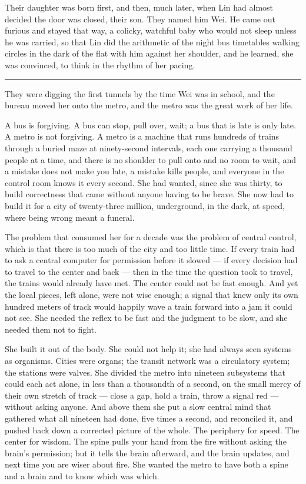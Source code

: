 Their daughter was born first, and then, much later, when Lin had almost decided the door was closed, their son. They named him Wei. He came out furious and stayed that way, a colicky, watchful baby who would not sleep unless he was carried, so that Lin did the arithmetic of the night bus timetables walking circles in the dark of the flat with him against her shoulder, and he learned, she was convinced, to think in the rhythm of her pacing.

\begin{center}\rule{0.3\linewidth}{0.4pt}\end{center}

They were digging the first tunnels by the time Wei was in school, and the bureau moved her onto the metro, and the metro was the great work of her life.

A bus is forgiving. A bus can stop, pull over, wait; a bus that is late is only late. A metro is not forgiving. A metro is a machine that runs hundreds of trains through a buried maze at ninety-second intervals, each one carrying a thousand people at a time, and there is no shoulder to pull onto and no room to wait, and a mistake does not make you late, a mistake kills people, and everyone in the control room knows it every second. She had wanted, since she was thirty, to build correctness that came without anyone having to be brave. She now had to build it for a city of twenty-three million, underground, in the dark, at speed, where being wrong meant a funeral.

The problem that consumed her for a decade was the problem of central control, which is that there is too much of the city and too little time. If every train had to ask a central computer for permission before it slowed --- if every decision had to travel to the center and back --- then in the time the question took to travel, the trains would already have met. The center could not be fast enough. And yet the local pieces, left alone, were not wise enough; a signal that knew only its own hundred meters of track would happily wave a train forward into a jam it could not see. She needed the reflex to be fast and the judgment to be slow, and she needed them not to fight.

She built it out of the body. She could not help it; she had always seen systems as organisms. Cities were organs; the transit network was a circulatory system; the stations were valves. She divided the metro into nineteen subsystems that could each act alone, in less than a thousandth of a second, on the small mercy of their own stretch of track --- close a gap, hold a train, throw a signal red --- without asking anyone. And above them she put a slow central mind that gathered what all nineteen had done, five times a second, and reconciled it, and pushed back down a corrected picture of the whole. The periphery for speed. The center for wisdom. The spine pulls your hand from the fire without asking the brain's permission; but it tells the brain afterward, and the brain updates, and next time you are wiser about fire. She wanted the metro to have both a spine and a brain and to know which was which.

